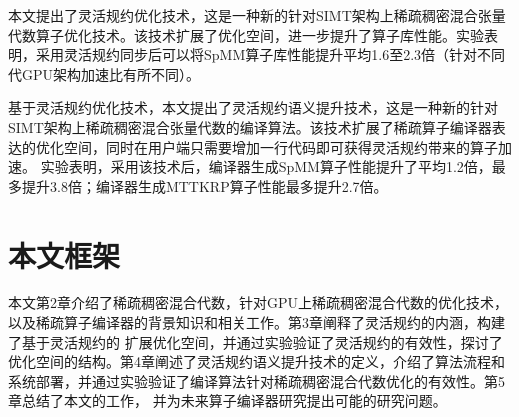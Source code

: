 本文提出了灵活规约优化技术，这是一种新的针对SIMT架构上稀疏稠密混合张量代数算子优化技术。该技术扩展了优化空间，进一步提升了算子库性能。实验表明，采用灵活规约同步后可以将SpMM算子库性能提升平均1.6至2.3倍（针对不同代GPU架构加速比有所不同）。

基于灵活规约优化技术，本文提出了灵活规约语义提升技术，这是一种新的针对SIMT架构上稀疏稠密混合张量代数的编译算法。该技术扩展了稀疏算子编译器表达的优化空间，同时在用户端只需要增加一行代码即可获得灵活规约带来的算子加速。
实验表明，采用该技术后，编译器生成SpMM算子性能提升了平均1.2倍，最多提升3.8倍；编译器生成MTTKRP算子性能最多提升2.7倍。

\section{本文框架}
本文第2章介绍了稀疏稠密混合代数，针对GPU上稀疏稠密混合代数的优化技术，以及稀疏算子编译器的背景知识和相关工作。第3章阐释了灵活规约的内涵，构建了基于灵活规约的
扩展优化空间，并通过实验验证了灵活规约的有效性，探讨了优化空间的结构。第4章阐述了灵活规约语义提升技术的定义，介绍了算法流程和系统部署，并通过实验验证了编译算法针对稀疏稠密混合代数优化的有效性。第5章总结了本文的工作，
并为未来算子编译器研究提出可能的研究问题。
